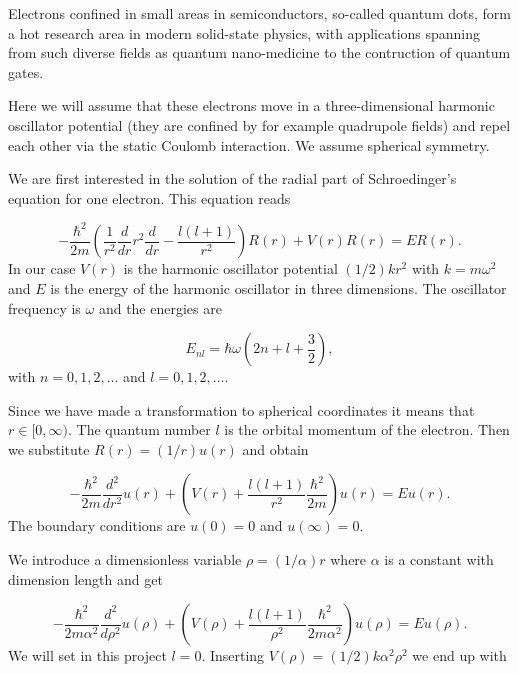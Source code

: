 \documentclass{article}
\begin{document}
Electrons confined in small areas in semiconductors, so-called quantum
dots, form a hot research area in modern solid-state physics, with
applications spanning from such diverse fields as quantum
nano-medicine to the contruction of quantum gates. 

Here we will assume that these electrons move in a three-dimensional harmonic
oscillator potential (they are confined by for example quadrupole fields)
and repel  each other via the static Coulomb interaction.  
We assume spherical symmetry.  

We are first interested in the solution of the radial part of Schroedinger's equation for one electron. This equation reads

\begin{equation*}
  -\frac{\hbar^2}{2 m} \left ( \frac{1}{r^2} \frac{d}{dr} r^2
  \frac{d}{dr} - \frac{l (l + 1)}{r^2} \right )R(r) 
     + V(r) R(r) = E R(r).
\end{equation*}
In our case $V(r)$ is the harmonic oscillator potential $(1/2)kr^2$ with
$k=m\omega^2$ and $E$ is
the energy of the harmonic oscillator in three dimensions.
The oscillator frequency is $\omega$ and the energies are

\begin{equation*}
E_{nl}=  \hbar \omega \left(2n+l+\frac{3}{2}\right),
\end{equation*}
with $n=0,1,2,\dots$ and $l=0,1,2,\dots$.

Since we have made a transformation to spherical coordinates it means that 
$r\in [0,\infty)$.  
The quantum number
$l$ is the orbital momentum of the electron.  
% 
Then we substitute $R(r) = (1/r) u(r)$ and obtain
% 

\begin{equation*}
  -\frac{\hbar^2}{2 m} \frac{d^2}{dr^2} u(r) 
       + \left ( V(r) + \frac{l (l + 1)}{r^2}\frac{\hbar^2}{2 m}
                                    \right ) u(r)  = E u(r) .
\end{equation*}
% 
The boundary conditions are $u(0)=0$ and $u(\infty)=0$.

We introduce a dimensionless variable $\rho = (1/\alpha) r$
where $\alpha$ is a constant with dimension length and get
% 

\begin{equation*}
  -\frac{\hbar^2}{2 m \alpha^2} \frac{d^2}{d\rho^2} u(\rho) 
       + \left ( V(\rho) + \frac{l (l + 1)}{\rho^2}
         \frac{\hbar^2}{2 m\alpha^2} \right ) u(\rho)  = E u(\rho) .
\end{equation*}
% 
We will set in this project $l=0$.
Inserting $V(\rho) = (1/2) k \alpha^2\rho^2$ we end up with
\end{document}
